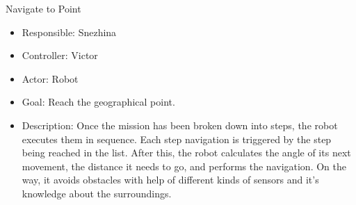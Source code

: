 Navigate to Point
\begin{itemize}
    \item Responsible: Snezhina
    \item Controller: Victor
    \item Actor: Robot
    \item Goal: Reach the geographical point.
    \item Description: Once the mission has been broken down into steps, the robot executes them in sequence. Each step navigation is triggered by the step being reached in the list. After this, the robot calculates the angle of its next movement, the distance it needs to go, and performs the navigation. On the way, it avoids obstacles with help of different
kinds of sensors and it's knowledge about the surroundings.
\end{itemize}